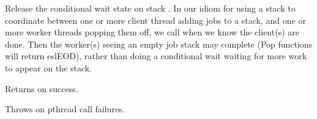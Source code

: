 \begin{sreapi}
Release the conditional wait state on stack . In our
idiom for using a stack to coordinate between one or
more client thread adding jobs to a stack, and one or
more worker threads popping them off, we call
 when we know the client(s) are
done. Then the worker(s) seeing an empty job stack may
complete (Pop functions will return eslEOD), rather than
doing a conditional wait waiting for more work to appear
on the stack.

Returns  on success.

Throws  on pthread call failures.


\end{sreapi}

